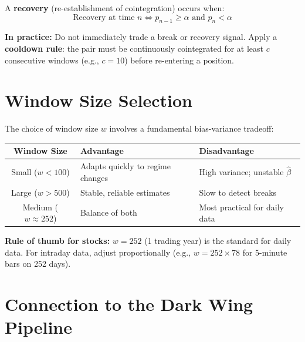 \documentclass[12pt, a4paper]{article}
\begin{document}
A \textbf{recovery} (re-establishment of cointegration) occurs when:
\begin{equation}
    \text{Recovery at time } n \iff p_{n-1} \geq \alpha \text{ and } p_n < \alpha
    \label{eq:recovery}
\end{equation}

\textbf{In practice:} Do not immediately trade a break or recovery signal. 
Apply a \textbf{cooldown rule}: the pair must be continuously cointegrated for at least 
$c$ consecutive windows (e.g., $c = 10$) before re-entering a position.

\section{Window Size Selection}

The choice of window size $w$ involves a fundamental bias-variance tradeoff:

\begin{center}
\begin{tabular}{@{}cll@{}}
\toprule
\textbf{Window Size} & \textbf{Advantage} & \textbf{Disadvantage} \\
\midrule
Small ($w < 100$)  & Adapts quickly to regime changes & High variance; unstable $\hat\beta$ \\
Large ($w > 500$)  & Stable, reliable estimates        & Slow to detect breaks \\
Medium ($w \approx 252$) & Balance of both              & Most practical for daily data \\
\bottomrule
\end{tabular}
\end{center}

\textbf{Rule of thumb for stocks:} $w = 252$ (1 trading year) is the standard for daily data.
For intraday data, adjust proportionally (e.g., $w = 252 \times 78$ for 5-minute bars on 252 days).

\section{Connection to the Dark Wing Pipeline}
\end{document}
